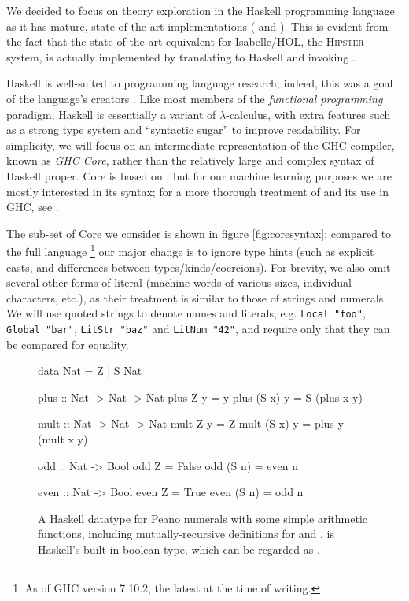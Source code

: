 We decided to focus on theory exploration in the Haskell programming language as it has mature, state-of-the-art implementations (\qspec{} \citep{QuickSpec} and \hspec{} \citep{claessen2013automating}). This is evident from the fact that the state-of-the-art equivalent for Isabelle/HOL, the \textsc{Hipster} \citep{Hipster} system, is actually implemented by translating to Haskell and invoking \hspec{}.

Haskell is well-suited to programming language research; indeed, this was a goal of the language's creators \citep{marlow2010haskell}. Like most members of the \emph{functional programming} paradigm, Haskell is essentially a variant of $\lambda$-calculus, with extra features such as a strong type system and ``syntactic sugar'' to improve readability. For simplicity, we will focus on an intermediate representation of the \textsc{GHC} compiler, known as \emph{GHC Core}, rather than the relatively large and complex syntax of Haskell proper. Core is based on \fc{}, but for our machine learning purposes we are mostly interested in its syntax; for a more thorough treatment of \fc{} and its use in GHC, see \citep[Appendix C]{sulzmann2007system}.

The sub-set of Core we consider is shown in figure \ref{fig:coresyntax}; compared to the full language \footnote{As of GHC version 7.10.2, the latest at the time of writing.} our major change is to ignore type hints (such as explicit casts, and differences between types/kinds/coercions). For brevity, we also omit several other forms of literal (machine words of various sizes, individual characters, etc.), as their treatment is similar to those of strings and numerals. We will use quoted strings to denote names and literals, e.g. \texttt{Local "foo"}, \texttt{Global "bar"}, \texttt{LitStr "baz"} and \texttt{LitNum "42"}, and require only that they can be compared for equality.

\begin{figure}
  \begin{haskell}
    data Nat = Z
             | S Nat

    plus :: Nat -> Nat -> Nat
    plus    Z  y = y
    plus (S x) y = S (plus x y)

    mult :: Nat -> Nat -> Nat
    mult    Z  y = Z
    mult (S x) y = plus y (mult x y)

    odd :: Nat -> Bool
    odd    Z  = False
    odd (S n) = even n

    even :: Nat -> Bool
    even    Z  = True
    even (S n) = odd n
  \end{haskell}
  \caption{A Haskell datatype for Peano numerals with some simple arithmetic functions, including mutually-recursive definitions for  and .  is Haskell's built in boolean type, which can be regarded as .}
  \label{fig:haskellexample}
\end{figure}

